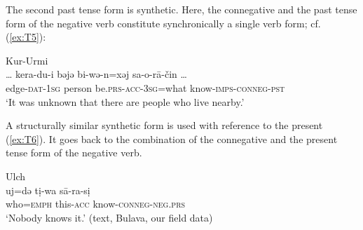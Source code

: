 \documentclass[output=paper]{langscibook}
\begin{document}
The second past tense form is synthetic. Here, the connegative and the past tense form of the negative verb constitute synchronically a single verb form; cf. (\ref{ex:T5}):

\ea Kur-Urmi \label{ex:T5}\\
	\gll … kera-du-i	bəjə	bi-wə-n=xəj	{sa-o-rā-čin …}\\
	{} edge-\textsc{dat-1sg}	person	be.\textsc{prs-acc-3sg}=what	know-\textsc{imps-conneg-pst} {}\\
	\glt `It was unknown that there are people who live nearby.' \citep[145, text]{sunik1958a}
\z

A structurally similar synthetic form is used with reference to the present (\ref{ex:T6}). It goes back to the combination of the connegative and the present tense form of the negative verb.

\ea Ulch \label{ex:T6}\\
	\gll uj=də	tị-wa	sā-ra-sị\\
	who=\textsc{emph}	this-\textsc{acc}	know-\textsc{conneg-neg.prs}\\
	\glt `Nobody knows it.' (text, Bulava, our field data)
\z
\end{document}
